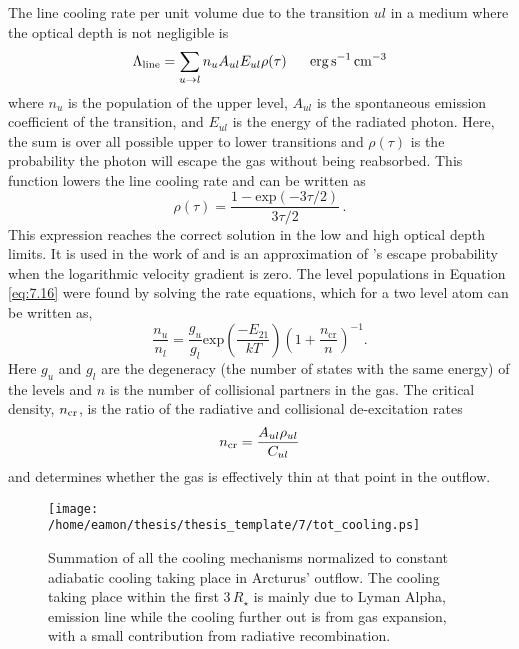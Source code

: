 The line cooling rate per unit volume due to the transition $ul$ in a medium where the optical depth is not negligible is 
\begin{equation}\label{eq:7.16}
\Lambda _{\rm{line}} =\sum_{u\rightarrow l} n_{u}A_{ul}E_{ul}\rho (\tau) \ \ \ \ \ \rm{erg}\,\rm{s^{-1}\,cm^{-3}}
\end{equation}
where $n_{u}$ is the population of the upper level, $A_{ul}$ is the spontaneous emission coefficient of the transition, and $E_{ul}$ is the energy of the radiated photon. Here, the sum is over all possible upper to lower transitions and $\rho (\tau)$ is the probability the photon will escape the gas without being reabsorbed. This function lowers the line cooling rate and can be written as 
\begin{equation}
\rho (\tau) = \frac{1-\mathrm{exp}(-3\tau /2)}{3\tau /2}\,.
\end{equation}
This expression reaches the correct solution in the low and high optical depth limits. It is used in the work of \cite{rodgers_1991} and is an approximation of \cite{castor_1970}'s escape probability when the logarithmic velocity gradient is zero.  The level populations in Equation \ref{eq:7.16} were found by solving the rate equations, which for a two level atom can be written as,
\begin{equation}
\frac{n_u}{n_l}=\frac{g_u}{g_l}\mathrm{exp} \left( \frac{-E_{21}}{kT}\right)\left( 1+\frac{n_{\mathrm{cr}}}{n} \right)^{-1}.
\end{equation}
Here $g_{u}$ and $g_{l}$ are the degeneracy (the number of states with the same energy) of the levels and $n$ is the number of collisional partners in the gas. The critical density, $n_{\rm{cr}}$, is the ratio of the radiative and collisional de-excitation rates
\begin{equation}
n_{\rm{cr}}=\frac{A_{ul}\rho _{ul}}{C_{ul}}
\end{equation}
and determines whether the gas is effectively thin at that point in the outflow.

\begin{figure}[!t]
\centering 
         \texttt{[image: /home/eamon/thesis/thesis\_template/7/tot\_cooling.ps]}
\caption[Summation of all cooling mechanisms]{Summation of all the cooling mechanisms normalized to constant adiabatic cooling taking place in Arcturus' outflow. The cooling taking place within the first $3\,R_{\star}$ is mainly due to Lyman Alpha, emission line while the cooling further out is from gas expansion, with a small contribution from radiative recombination.}
\label{fig:7.2}
\end{figure}

